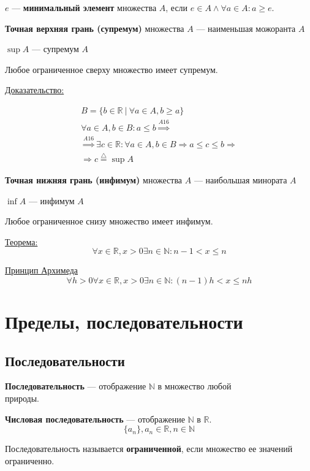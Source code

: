 \documentclass{article}
\begin{document}
$e$ --- \textbf{минимальный элемент} множества $A$, если $e \in A \land \forall a \in A : a \ge e$.

\textbf{Точная верхняя грань (супремум)} множества $A$ --- наименьшая можоранта $A$

$\sup A$ --- супремум $A$

Любое ограниченное сверху множество имеет супремум.

\underline{Доказательство:}

\begin{gather*}
	B = \{b \in \mathbb{R}\ |\ \forall a \in A, b \ge a\} \\
	\forall a \in A, b \in B : a \le b \stackrel{A16}{\Rightarrow} \\
	\stackrel{A16}{\Rightarrow} \exists c \in \mathbb{R} :
	\forall a \in A, b \in B \Rightarrow a \le c \le b \Rightarrow \\
	\Rightarrow c \stackrel{\triangle}{=} \sup A
\end{gather*}

\textbf{Точная нижняя грань (инфимум)} множества $A$ --- наибольшая минората $A$

$\inf A$ --- инфимум $A$

Любое ограниченное снизу множество имеет инфимум.

\pagebreak
\underline{Теорема:}
\[
	\forall x \in \mathbb{R}, x > 0 \exists n \in \mathbb{N} : n - 1 < x \le n
\]

\underline{Принцип Архимеда}
\[
\forall h > 0 \forall x \in \mathbb{R}, x > 0 \exists n \in \mathbb{N} : (n - 1)h < x \le nh
\]

\section{Пределы, последовательности}

\subsection{Последовательности}

\textbf{Последовательность} --- отображение $\mathbb{N}$ в множество любой \\
природы.

\textbf{Числовая последовательность} --- отображение $\mathbb{N}$ в $\mathbb{R}$.
\[ \{ a_n \}, a_n \in \mathbb{R}, n \in \mathbb{N} \]

Последовательность называется \textbf{ограниченной}, если множество ее значений ограниченно.
\end{document}
